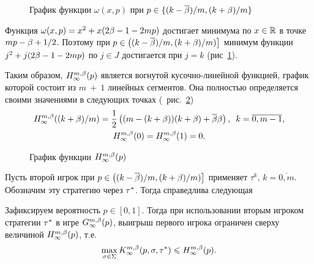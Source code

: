 {\begin{figure}[thb]
  \centering
  
  \caption{График функции $\omega(x,p)$ при $p \in \{(k-{{\overline{\beta}}})/m, (k+\beta)/m\}$}
  \label{ch1:fig:omega(x,p)}
\end{figure}

Функция $\omega(x, p) = x^2 + x(2\beta - 1 - 2mp)$ достигает минимума по $x \in \mathbb{R}$ в точке $m p - \beta + 1/2$.
Поэтому при $p \in \left( (k-{{\overline{\beta}}})/m, (k+\beta)/m) \right]$ минимум функции $j^2 + j(2\beta - 1 - 2 m p)$ по $j \in J$ достигается при $j = k$ (\seename рис~\ref{ch1:fig:omega(x,p)}).

Таким образом, $\H*{\infty}(p)$ является вогнутой кусочно-линейной функцией, график которой состоит из $m~+~1$ линейных сегментов.
Она полностью определяется своими значениями в следующих точках (\seename~рис.~\ref{ch1:fig:Hm})
\begin{gather*}
  \H*{\infty}((k+\Co)/m) = \frac{1}{2} \left( (m - (k + \Co))(k + \Co) + \DCo\Co
  \right),\enskip
  k = \overline{0, m - 1},\\
  \H*{\infty}(0) = \H*{\infty}(1) = 0.
\end{gather*}

\begin{figure}[thb]
  \centering
  \caption{График функции $\H*{\infty}(p)$}
  \label{ch1:fig:Hm}
\end{figure}

Пусть второй игрок при $p \in \left( (k-{{\overline{\beta}}})/m, (k+\beta)/m) \right]$ применяет $\tau^k, \, k = \overline{0, m}$.
Обозначим эту стратегию через $\tau^*$.
Тогда справедлива следующая
\begin{lemma}
  \label{ch1:lemma:upperBound}
  Зафиксируем вероятность $p \in [0,1]$.
  Тогда при использовании вторым игроком стратегии $\tau^*$ в игре $\theG*{\infty}(p)$\textup{,} выигрыш первого игрока ограничен сверху величиной $\H*{\infty}(p)$, т.е.
  \[
    \max_{\sigmar \in \Sigma} \K*{\infty}(p, \sigmar, \taur^*) \leq \H*{\infty}(p).
  \]
\end{lemma}

}
